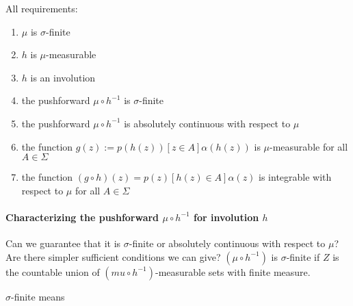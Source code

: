 \documentclass[twoside]{article}
\begin{document}
All requirements:
\begin{enumerate}
\item $\mu$ is $\sigma$-finite
\item $h$ is $\mu$-measurable
\item $h$ is an involution
\item the pushforward $\mu \circ h^{-1}$ is $\sigma$-finite
\item the pushforward $\mu \circ h^{-1}$ is absolutely continuous with respect to $\mu$
\item the function $g(z) := p(h(z)) [z \in A] \alpha(h(z))$ is $\mu$-measurable for all $A \in \Sigma$
\item the function $(g \circ h)(z) = p(z) [h(z) \in A] \alpha(z)$ is integrable with respect to $\mu$ for all $A \in \Sigma$
\end{enumerate}

\paragraph{Characterizing the pushforward $\mu \circ h^{-1}$ for involution $h$}
Can we guarantee that it is $\sigma$-finite or absolutely continuous with respect to $\mu$?
Are there simpler sufficient conditions we can give?
$(\mu \circ h^{-1})$ is $\sigma$-finite if $Z$ is the countable union of $(mu \circ h^{-1})$-measurable sets with finite measure.

$\sigma$-finite means 
\end{document}
